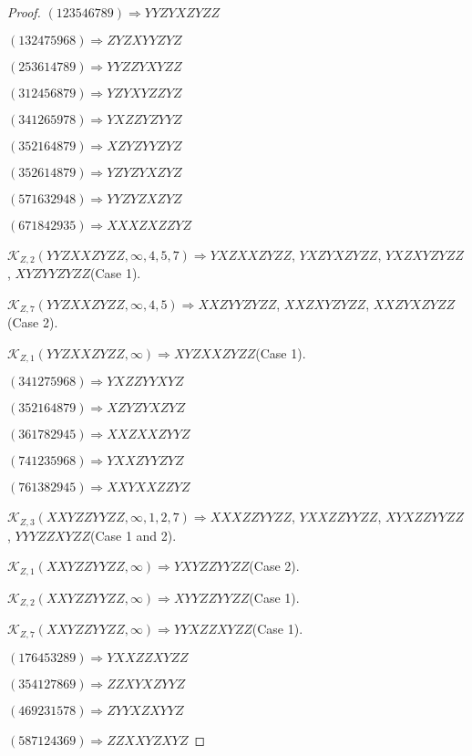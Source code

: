 \documentclass[12pt]{article}
\theoremstyle{plain}
\theoremstyle{definition}
\theoremstyle{remark}
\newcommand{\fancy}[1]{\mathcal{#1}}
\def\K{\fancy{K}}
\begin{document}
\begin{proof}
	
	
	$(1 2 3 5 4 6 7 8 9)\Rightarrow YYZYXZYZZ$
	
	$(1 3 2 4 7 5 9 6 8)\Rightarrow ZYZXYYZYZ$
	
	$(2 5 3 6 1 4 7 8 9)\Rightarrow YYZZYXYZZ$
	
	$(3 1 2 4 5 6 8 7 9)\Rightarrow YZYXYZZYZ$
	
	$(3 4 1 2 6 5 9 7 8)\Rightarrow YXZZYZYYZ$
	
	$(3 5 2 1 6 4 8 7 9)\Rightarrow XZYZYYZYZ$
	
	$(3 5 2 6 1 4 8 7 9)\Rightarrow YZYZYXZYZ$
	
	$(5 7 1 6 3 2 9 4 8)\Rightarrow YYZYZXZYZ$
	
	$(6 7 1 8 4 2 9 3 5)\Rightarrow XXXZXZZYZ$
	
	
	
	$\K_{Z,2}(YYZXXZYZZ,\infty,4, 5, 7)\Rightarrow $$YXZXXZYZZ$, $YXZYXZYZZ$, $YXZXYZYZZ$, $XYZYYZYZZ$(Case 1).
	
	$\K_{Z,7}(YYZXXZYZZ,\infty,4, 5)\Rightarrow $$XXZYYZYZZ$, $XXZXYZYZZ$, $XXZYXZYZZ$(Case 2).
	
	$\K_{Z,1}(YYZXXZYZZ,\infty)\Rightarrow $$XYZXXZYZZ$(Case 1).
	
	
	
	$(3 4 1 2 7 5 9 6 8)\Rightarrow YXZZYYXYZ$
	
	$(3 5 2 1 6 4 8 7 9)\Rightarrow XZYZYXZYZ$
	
	$(3 6 1 7 8 2 9 4 5)\Rightarrow XXZXXZYYZ$
	
	$(7 4 1 2 3 5 9 6 8)\Rightarrow YXXZYYZYZ$
	
	$(7 6 1 3 8 2 9 4 5)\Rightarrow XXYXXZZYZ$
	
	
	
	$\K_{Z,3}(XXYZZYYZZ,\infty,1, 2, 7)\Rightarrow $$XXXZZYYZZ$, $YXXZZYYZZ$, $XYXZZYYZZ$, $YYYZZXYZZ$(Case 1 and 2).
	
	$\K_{Z,1}(XXYZZYYZZ,\infty)\Rightarrow $$YXYZZYYZZ$(Case 2).
	
	$\K_{Z,2}(XXYZZYYZZ,\infty)\Rightarrow $$XYYZZYYZZ$(Case 1).
	
	$\K_{Z,7}(XXYZZYYZZ,\infty)\Rightarrow $$YYXZZXYZZ$(Case 1).
	
	
	
	$(1 7 6 4 5 3 2 8 9)\Rightarrow YXXZZXYZZ$
	
	$(3 5 4 1 2 7 8 6 9)\Rightarrow ZZXYXZYYZ$
	
	$(4 6 9 2 3 1 5 7 8)\Rightarrow ZYYXZXYYZ$
	
	$(5 8 7 1 2 4 3 6 9)\Rightarrow ZZXXYZXYZ$
	

\end{proof}
\end{document}
